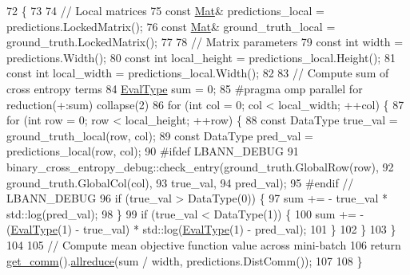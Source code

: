 \begin{DoxyCode}
72                                                                  \{
73 
74   \textcolor{comment}{// Local matrices}
75   \textcolor{keyword}{const} \hyperlink{base_8hpp_a68f11fdc31b62516cb310831bbe54d73}{Mat}& predictions\_local = predictions.LockedMatrix();
76   \textcolor{keyword}{const} \hyperlink{base_8hpp_a68f11fdc31b62516cb310831bbe54d73}{Mat}& ground\_truth\_local = ground\_truth.LockedMatrix();
77   
78   \textcolor{comment}{// Matrix parameters}
79   \textcolor{keyword}{const} \textcolor{keywordtype}{int} width = predictions.Width();
80   \textcolor{keyword}{const} \textcolor{keywordtype}{int} local\_height = predictions\_local.Height();
81   \textcolor{keyword}{const} \textcolor{keywordtype}{int} local\_width = predictions\_local.Width();
82 
83   \textcolor{comment}{// Compute sum of cross entropy terms}
84   \hyperlink{base_8hpp_a3266f5ac18504bbadea983c109566867}{EvalType} sum = 0;
85 \textcolor{preprocessor}{  #pragma omp parallel for reduction(+:sum) collapse(2)}
86   \textcolor{keywordflow}{for} (\textcolor{keywordtype}{int} col = 0; col < local\_width; ++col) \{
87     \textcolor{keywordflow}{for} (\textcolor{keywordtype}{int} row = 0; row < local\_height; ++row) \{
88       \textcolor{keyword}{const} DataType true\_val = ground\_truth\_local(row, col);
89       \textcolor{keyword}{const} DataType pred\_val = predictions\_local(row, col);
90 \textcolor{preprocessor}{      #ifdef LBANN\_DEBUG}
91       binary\_cross\_entropy\_debug::check\_entry(ground\_truth.GlobalRow(row),
92                                               ground\_truth.GlobalCol(col),
93                                               true\_val,
94                                               pred\_val);
95 \textcolor{preprocessor}{      #endif // LBANN\_DEBUG}
96       \textcolor{keywordflow}{if} (true\_val > DataType(0)) \{
97         sum += - true\_val * std::log(pred\_val);
98       \}
99       \textcolor{keywordflow}{if} (true\_val < DataType(1)) \{
100         sum += - (\hyperlink{base_8hpp_a3266f5ac18504bbadea983c109566867}{EvalType}(1) - true\_val) * std::log(\hyperlink{base_8hpp_a3266f5ac18504bbadea983c109566867}{EvalType}(1) - pred\_val);
101       \}
102     \}
103   \}
104 
105   \textcolor{comment}{// Compute mean objective function value across mini-batch}
106   \textcolor{keywordflow}{return} \hyperlink{classlbann_1_1objective__function__term_a5f89b676a26a6b76ddc26563ac87beb9}{get\_comm}().\hyperlink{classlbann_1_1lbann__comm_af5631e5f0f54e4df4958eba9df2599ef}{allreduce}(sum / width, predictions.DistComm());
107 
108 \}
\end{DoxyCode}

